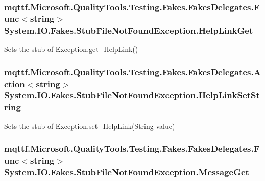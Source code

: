 \hypertarget{class_system_1_1_i_o_1_1_fakes_1_1_stub_file_not_found_exception_a446d88be92522b881373e71ad1d4dac9}{
\subsubsection[{Help\-Link\-Get}]{\setlength{\rightskip}{0pt plus 5cm}mqttf.\-Microsoft.\-Quality\-Tools.\-Testing.\-Fakes.\-Fakes\-Delegates.\-Func$<$string$>$ System.\-I\-O.\-Fakes.\-Stub\-File\-Not\-Found\-Exception.\-Help\-Link\-Get}}\label{class_system_1_1_i_o_1_1_fakes_1_1_stub_file_not_found_exception_a446d88be92522b881373e71ad1d4dac9}


Sets the stub of Exception.\-get\-\_\-\-Help\-Link()

\hypertarget{class_system_1_1_i_o_1_1_fakes_1_1_stub_file_not_found_exception_a573a2accfcbee3106dc8e2f672495fe5}{
\subsubsection[{Help\-Link\-Set\-String}]{\setlength{\rightskip}{0pt plus 5cm}mqttf.\-Microsoft.\-Quality\-Tools.\-Testing.\-Fakes.\-Fakes\-Delegates.\-Action$<$string$>$ System.\-I\-O.\-Fakes.\-Stub\-File\-Not\-Found\-Exception.\-Help\-Link\-Set\-String}}\label{class_system_1_1_i_o_1_1_fakes_1_1_stub_file_not_found_exception_a573a2accfcbee3106dc8e2f672495fe5}


Sets the stub of Exception.\-set\-\_\-\-Help\-Link(\-String value)

\hypertarget{class_system_1_1_i_o_1_1_fakes_1_1_stub_file_not_found_exception_acf87fda5fc73a2f01a86ac1d48d20e87}{
\subsubsection[{Message\-Get}]{\setlength{\rightskip}{0pt plus 5cm}mqttf.\-Microsoft.\-Quality\-Tools.\-Testing.\-Fakes.\-Fakes\-Delegates.\-Func$<$string$>$ System.\-I\-O.\-Fakes.\-Stub\-File\-Not\-Found\-Exception.\-Message\-Get}}\label{class_system_1_1_i_o_1_1_fakes_1_1_stub_file_not_found_exception_acf87fda5fc73a2f01a86ac1d48d20e87}


